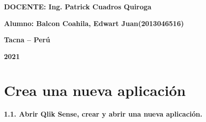 \documentclass{article}
\begin{document}
\begin{titlepage}
\begin{center}
\vspace*{0.3in}
\begin{Large}
\textbf{DOCENTE: Ing. Patrick Cuadros Quiroga} \\
\end{Large}

\vspace*{0.2in}
\vspace*{0.1in}
\begin{large}

\begin{Large}
\textbf{Alumno: Balcon Coahila, Edwart Juan\hfill	(2013046516) } \\
\end{Large}

\vspace*{0.15in}
\begin{Large}
\textbf{Tacna – Perú} \\
\end{Large}

\vspace*{0.05in}
\begin{Large}
\textbf{2021 } \\
\end{Large}

\end{large}
\end{center}

\end{titlepage}


\newpage

\section{Crea una nueva aplicación}

\textbf{1.1. Abrir Qlik Sense, crear y abrir una nueva aplicación.}
\end{document}
